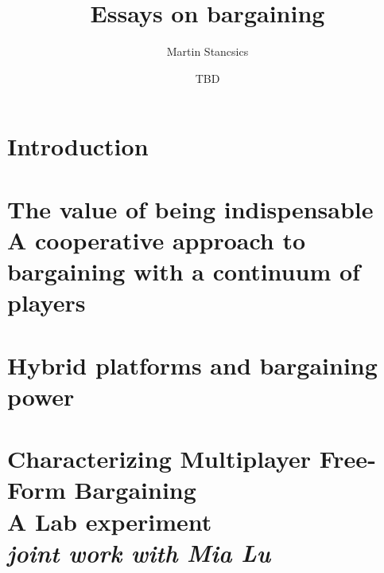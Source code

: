 \documentclass[a4paper]{report}
\title{Essays on bargaining}
\author{Martin Stancsics}
\date{TBD}
\begin{document}




\tableofcontents
{}

\onehalfspacing

\chapter{Introduction}
\label{ch:introduction}
\setcounter{page}{1}



\chapter[The value of being indispensable]{%
    The value of being indispensable\\\vspace{0.4cm}%
    \large{A cooperative approach to bargaining with a continuum of players}%
}
\label{ch:theory}

\begin{subappendices}
    
\end{subappendices}

\chapter{Hybrid platforms and bargaining power}
\label{ch:application}

\begin{subappendices}
    
\end{subappendices}

\chapter[Characterizing Multiplayer Free-Form Bargaining]{%
    Characterizing Multiplayer Free-Form Bargaining\\\vspace{0.4cm}%
    \large{A Lab experiment}\\\vspace{0.2cm}%
    \large{\textit{joint work with Mia Lu}}%
}
\label{ch:experiment}

\begin{subappendices}
    
\end{subappendices}

\singlespacing

\printbibliography
\end{document}
